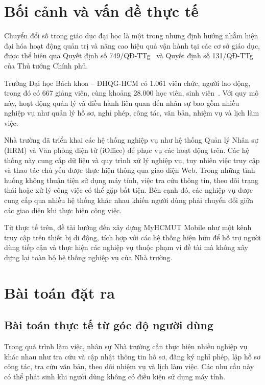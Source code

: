 \section{Bối cảnh và vấn đề thực tế}
\label{sec:boicanh_thucte}

Chuyển đổi số trong giáo dục đại học là một trong những định hướng nhằm hiện đại hóa hoạt động quản trị và nâng cao hiệu quả vận hành tại các cơ sở giáo dục, được thể hiện qua Quyết định số 749/QĐ-TTg~\cite{qd_749_ttg} và Quyết định số 131/QĐ-TTg~\cite{qd_131_ttg} của Thủ tướng Chính phủ.

Trường Đại học Bách khoa -- ĐHQG-HCM có 1.061 viên chức, người lao động, trong đó có 667 giảng viên, cùng khoảng 28.000 học viên, sinh viên~\cite{hcmut_overview_2026}. Với quy mô này, hoạt động quản lý và điều hành liên quan đến nhân sự bao gồm nhiều nghiệp vụ như quản lý hồ sơ, nghỉ phép, công tác, văn bản, nhiệm vụ và lịch làm việc.

Nhà trường đã triển khai các hệ thống nghiệp vụ như hệ thống Quản lý Nhân sự (HRM) và Văn phòng điện tử (iOffice) để phục vụ các hoạt động trên. Các hệ thống này cung cấp dữ liệu và quy trình xử lý nghiệp vụ, tuy nhiên việc truy cập và thao tác chủ yếu được thực hiện thông qua giao diện Web. Trong những tình huống không thuận tiện sử dụng máy tính, việc tra cứu thông tin, theo dõi trạng thái hoặc xử lý công việc có thể gặp bất tiện. Bên cạnh đó, các nghiệp vụ được cung cấp qua nhiều hệ thống khác nhau khiến người dùng phải chuyển đổi giữa các giao diện khi thực hiện công việc.

Từ thực tế trên, đề tài hướng đến xây dựng MyHCMUT Mobile như một kênh truy cập trên thiết bị di động, tích hợp với các hệ thống hiện hữu để hỗ trợ người dùng tiếp cận và thực hiện các nghiệp vụ thuộc phạm vi đề tài mà không xây dựng lại toàn bộ hệ thống nghiệp vụ của Nhà trường.

\section{Bài toán đặt ra}
\label{sec:baitoandatra}

\subsection{Bài toán thực tế từ góc độ người dùng}
\label{subsec:baitoan_thucte_nguoidung}

Trong quá trình làm việc, nhân sự Nhà trường cần thực hiện nhiều nghiệp vụ khác nhau như tra cứu và cập nhật thông tin hồ sơ, đăng ký nghỉ phép, lập hồ sơ công tác, tra cứu văn bản, theo dõi nhiệm vụ và lịch làm việc. Các nhu cầu này có thể phát sinh khi người dùng không có điều kiện sử dụng máy tính.

